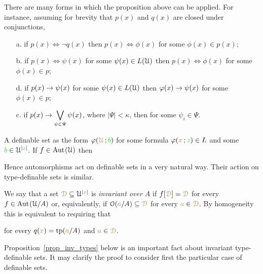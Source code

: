 \documentclass[creche.tex]{subfiles}
\begin{document}
\begin{remark}\label{rem_normality}There are many forms in which the proposition above can be applied. For instance, assuming for brevity that $p(x)$ and $q(x)$ are closed under conjunctions,
\begin{itemize}
\item[a.] if $p(x)\iff\neg q(x)$ then $p(x)\iff\phi(x)$ for some $\phi(x)\in p(x)$;\smallskip
\item[b.] if $\displaystyle p(x)\iff\psi(x)$ for some $\psi(x)\in L(\EuScript U)$ then $p(x)\iff\phi(x)$ for some $\phi(x)\in p$;\smallskip
\item[d.] if $\displaystyle p(x)\rightarrow\psi(x)$ for some $\psi(x)\in L(\EuScript U)$ then $\varphi(x)\rightarrow\psi(x)$ for some $\phi(x)\in p$;\smallskip
\item[c.] if $\displaystyle p(x)\rightarrow\bigvee_{\psi\in\Psi}\psi(x)$, where $|\Psi|<\kappa$,  then  for some $\psi_i\in\Psi$.\QED
\end{itemize}
\end{remark}

A definable set as the form $\varphi({\color{brown}\EuScript U}\,;{\color{green} b})$ for some formula $\varphi({\color{brown} x}\,;{\color{green} z})\in L$ and some ${\color{green} b}\in\EuScript U^{|{\color{green} z}|}$. If $f\in\textrm{Aut\kern.15ex}(\EuScript U)$ then 




Hence automorphisms act on definable sets in a very natural way. Their action on type-definable sets is similar.

We say that a set ${\color{brown}\EuScript D}\subseteq\EuScript U^{|{\color{brown} x}|}$ is \emph{invariant over $A$\/} if $f[{\color{brown}\EuScript D}]={\color{brown}\EuScript D}$ for every $f\in\textrm{Aut\kern.15ex}(\EuScript U/A)$ or, equivalently, if $\EuScript O({\color{brown} a}/A)\subseteq {\color{brown}\EuScript D}$ for every ${\color{brown} a}\in {\color{brown}\EuScript D}$.
By homogeneity this is equivalent to requiring that 


for every $q({\color{brown} x})={\rm tp}({\color{brown} a}/A)$ and ${\color{brown} a}\in {\color{brown}\EuScript D}$.

Proposition~\ref{prop_inv_types} below is an important fact about invariant type-definable sets. It may clarify the proof to consider first the particular case of definable sets.
\end{document}

